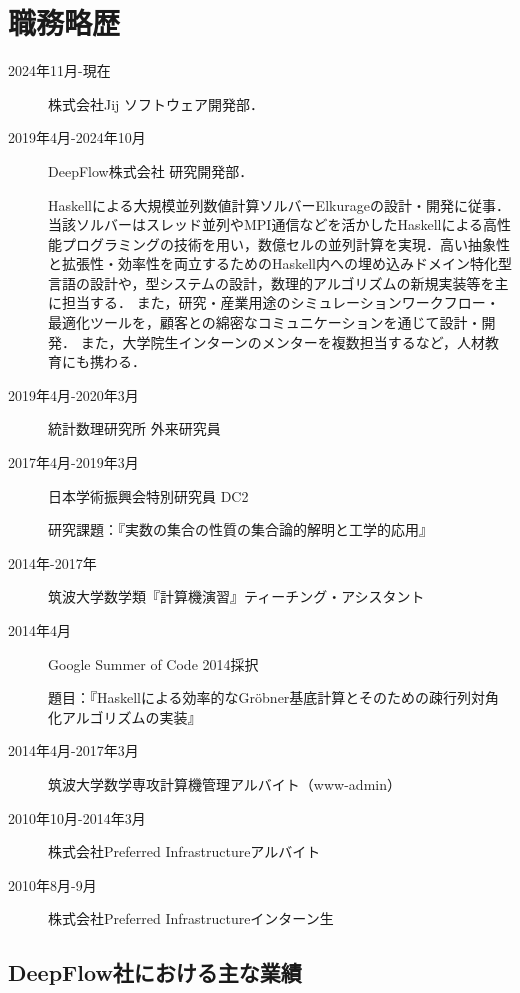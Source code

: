 \documentclass[a4j]{ltjsarticle}
\begin{document}
\section*{職務略歴}
\begin{refsection}
  \newrefcontext[labelprefix={J-}] 
\begin{description}
 \item[2024年11月-現在] 株式会社Jij ソフトウェア開発部．
 \item[2019年4月-2024年10月] DeepFlow株式会社 研究開発部．
 
  Haskellによる大規模並列数値計算ソルバーElkurageの設計・開発に従事．当該ソルバーはスレッド並列やMPI通信などを活かしたHaskellによる高性能プログラミングの技術を用い，数億セルの並列計算を実現．高い抽象性と拡張性・効率性を両立するためのHaskell内への埋め込みドメイン特化型言語の設計や，型システムの設計，数理的アルゴリズムの新規実装等を主に担当する．
  また，研究・産業用途のシミュレーションワークフロー・最適化ツールを，顧客との綿密なコミュニケーションを通じて設計・開発．
  また，大学院生インターンのメンターを複数担当するなど，人材教育にも携わる．

 \item[2019年4月-2020年3月] 統計数理研究所 外来研究員
 \item[2017年4月-2019年3月]
              日本学術振興会特別研究員 DC2

              研究課題：『実数の集合の性質の集合論的解明と工学的応用』
 \item[2014年-2017年] 筑波大学数学類『計算機演習』ティーチング・アシスタント
 \item[2014年4月] Google Summer of Code 2014採択

            題目：『Haskellによる効率的なGr\"{o}bner基底計算とそのための疎行列対角化アルゴリズムの実装』
 \item[2014年4月-2017年3月] 筑波大学数学専攻計算機管理アルバイト（www-admin）
 \item[2010年10月-2014年3月] 株式会社Preferred Infrastructureアルバイト
 \item[2010年8月-9月] 株式会社Preferred Infrastructureインターン生
\end{description}

\subsection*{DeepFlow社における主な業績}


\end{refsection}
\end{document}
